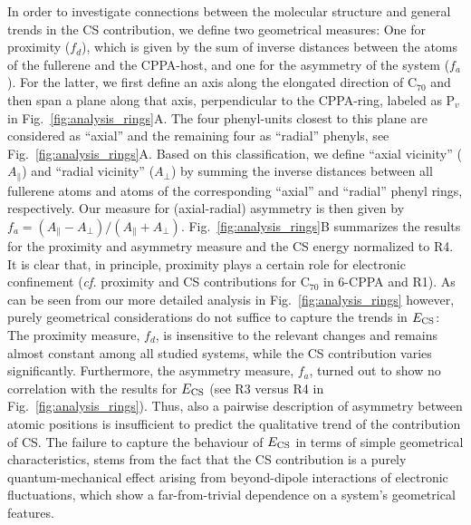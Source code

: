 \documentclass[aps,prl,groupaddress, twocolumn]{revtex4-1}  %
\begin{document}
In order to investigate connections between the molecular structure and general trends in the CS contribution, we define two geometrical measures:
One for proximity ($f_d$), which is given by the sum of inverse distances between the atoms of the fullerene and the CPPA-host, and one for the asymmetry of the system ($f_a$).
For the latter, we first define an axis along the elongated direction of C$_{70}$ and then span a plane along that axis, perpendicular to the CPPA-ring, labeled as P$_v$ in Fig.~\ref{fig:analysis_rings}A.
The four phenyl-units closest to this plane are considered as ``axial'' and the remaining four as ``radial'' phenyls, see Fig.~\ref{fig:analysis_rings}A.
Based on this classification, we define ``axial vicinity'' ($A_{\parallel}$) and ``radial vicinity'' ($A_{\perp}$) by summing the inverse distances between all fullerene atoms and atoms of the corresponding ``axial'' and ``radial'' phenyl rings, respectively.
Our measure for (axial-radial) asymmetry is then given by $f_a = (A_{\parallel} - A_{\perp})/(A_{\parallel} + A_{\perp})$. Fig.~\ref{fig:analysis_rings}B summarizes the results for the proximity and asymmetry measure and the CS energy normalized to R4.
It is clear that, in principle, proximity plays a certain role for electronic confinement (\textit{cf.} proximity and CS contributions for C$_{70}$ in 6-CPPA and R1). As can be seen from our more detailed analysis in Fig.~\ref{fig:analysis_rings} however, purely geometrical considerations do not suffice to capture the trends in $E_{\rm CS}$: The proximity measure, $f_d$, is insensitive to the relevant changes and remains almost constant among all studied systems, while the CS contribution varies significantly.
Furthermore, the asymmetry measure, $f_a$, turned out to show no correlation with the results for $E_{\rm CS}$ (see R3 versus R4 in Fig.~\ref{fig:analysis_rings}).
Thus, also a pairwise description of asymmetry between atomic positions is insufficient to predict the qualitative trend of the contribution of CS\@.
The failure to capture the behaviour of $E_{\rm CS}$ in terms of simple geometrical characteristics, stems from the fact that the CS contribution is a purely quantum-mechanical effect arising from beyond-dipole interactions of electronic fluctuations, which show a far-from-trivial dependence on a system's geometrical features.\\
\end{document}
